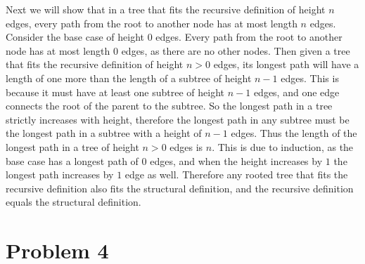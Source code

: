 \documentclass[12pt]{article}
\begin{document}
Next we will show that in a tree that fits the recursive definition of height \(n\) edges, every path from the root to another node has at most length \(n\) edges.
Consider the base case of height \(0\) edges. Every path from the root to another node has at most length \(0\) edges, as there are no other nodes. Then given a
tree that fits the recursive definition of height \(n>0\) edges, its longest path will have a length of one more than the length of a subtree of height \(n-1\) edges.
This is because it must have at least one subtree of height \(n-1\) edges, and one edge connects the root of the parent to the subtree. So the longest path in a tree
strictly increases with height, therefore the longest path in any subtree must be the longest path in a subtree with a height of \(n-1\) edges. Thus
the length of the longest path in a tree of height \(n>0\) edges is \(n\). This is due to induction, as the base case has a longest path of \(0\) edges, and when
the height increases by \(1\) the longest path increases by \(1\) edge as well. Therefore any rooted tree that fits the recursive definition also fits the
structural definition, and the recursive definition equals the structural definition.

\section*{Problem 4}

\begin{center}
\end{center}
\end{document}
